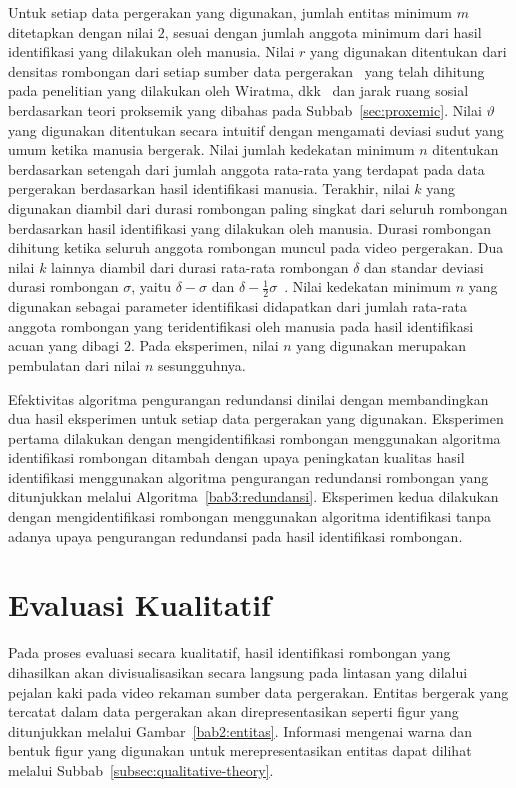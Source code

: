 Untuk setiap data pergerakan yang digunakan, jumlah entitas minimum $m$ ditetapkan dengan nilai $2$, sesuai dengan jumlah anggota minimum dari hasil identifikasi yang dilakukan oleh manusia. Nilai $r$ yang digunakan ditentukan dari densitas rombongan dari setiap sumber data pergerakan~\cite{solera:06:range-reference} yang telah dihitung pada penelitian yang dilakukan oleh Wiratma, dkk~\cite{wiratma:software} dan jarak ruang sosial berdasarkan teori proksemik yang dibahas pada Subbab~\ref{sec:proxemic}. Nilai $\vartheta$ yang digunakan ditentukan secara intuitif dengan mengamati deviasi sudut yang umum ketika manusia bergerak. Nilai jumlah kedekatan minimum $n$ ditentukan berdasarkan setengah dari jumlah anggota rata-rata yang terdapat pada data pergerakan berdasarkan hasil identifikasi manusia. Terakhir, nilai $k$ yang digunakan diambil dari durasi rombongan paling singkat dari seluruh rombongan berdasarkan hasil identifikasi yang dilakukan oleh manusia. Durasi rombongan dihitung ketika seluruh anggota rombongan muncul pada video pergerakan. Dua nilai $k$ lainnya diambil dari durasi rata-rata rombongan $\delta$ dan standar deviasi durasi rombongan $\sigma$, yaitu $\delta - \sigma$ dan $\delta - \frac{1}{2}\sigma$~\cite{wiratma:software}. Nilai kedekatan minimum $n$ yang digunakan sebagai parameter identifikasi didapatkan dari jumlah rata-rata anggota rombongan yang teridentifikasi oleh manusia pada hasil identifikasi acuan yang dibagi $2$. Pada eksperimen, nilai $n$ yang digunakan merupakan pembulatan dari nilai $n$ sesungguhnya. 

Efektivitas algoritma pengurangan redundansi dinilai dengan membandingkan dua hasil eksperimen untuk setiap data pergerakan yang digunakan. Eksperimen pertama dilakukan dengan mengidentifikasi rombongan menggunakan algoritma identifikasi rombongan ditambah dengan upaya peningkatan kualitas hasil identifikasi menggunakan algoritma pengurangan redundansi rombongan yang ditunjukkan melalui Algoritma~\ref{bab3:redundansi}. Eksperimen kedua dilakukan dengan mengidentifikasi rombongan menggunakan algoritma identifikasi tanpa adanya upaya pengurangan redundansi pada hasil identifikasi rombongan.

\section{Evaluasi Kualitatif}
\label{sec:qualitative}

Pada proses evaluasi secara kualitatif, hasil identifikasi rombongan yang dihasilkan akan divisualisasikan secara langsung pada lintasan yang dilalui pejalan kaki pada video rekaman sumber data pergerakan. Entitas bergerak yang tercatat dalam data pergerakan akan direpresentasikan seperti figur yang ditunjukkan melalui Gambar~\ref{bab2:entitas}. Informasi mengenai warna dan bentuk figur yang digunakan untuk merepresentasikan entitas dapat dilihat melalui Subbab~\ref{subsec:qualitative-theory}.

